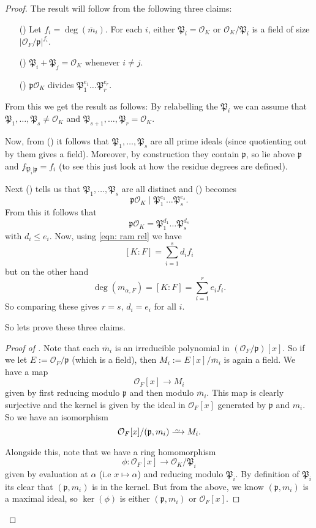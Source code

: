 \documentclass[11pt,a4paper]{report}
\theoremstyle{plain}
\theoremstyle{definition}
\theoremstyle{definition}
\def \gothP{\mathfrak{P}}
\def\gothp{\mathfrak{p}}
\def \a{\alpha}
\def \OO {\mathcal{O}}
\def \ov{\overline}
\def \lra{\longrightarrow}
\newcommand\isorightarrow{\xrightarrow{
		\,\smash{\raisebox{-0.65ex}{\ensuremath{\scriptstyle\sim}}}\,}}
\begin{document}
	\begin{proof}
		The result will  follow from the following three claims:
		\begin{itemize}
			\item[(\faGamepad)] Let $f_i=\deg(\ov{m}_i)$. For each $i$, either  $\gothP_i=\OO_K$ or $\OO_K/\gothP_i$ is a field of size $|\OO_F/\gothp|^{f_i}$.
			\item[(\faRocket)] $\gothP_i+\gothP_j=\OO_K$ whenever $i \neq j$.
			\item [(\faMotorcycle)] $\gothp\OO_K$ divides $\gothP_1^{e_1}\dots\gothP_r^{e_r}$.
		\end{itemize}
		
		From this we get the result as follows: By relabelling the $\gothP_i$ we can assume that  $\gothP_1,\dots,\gothP_s \neq \OO_K$ and $\gothP_{s+1},\dots,\gothP_r=\OO_K$. 
		
		Now, from (\faGamepad) it follows that  $\gothP_1,\dots,\gothP_s$ are all prime ideals (since quotienting out by them gives a field). Moreover, by construction they contain $\gothp$, so lie above $\gothp$ and $f_{\gothP_i|\gothp}=f_i$ (to see this just look at how the residue degrees are defined).
		
		Next (\faRocket) tells us that  $\gothP_1,\dots,\gothP_s$ are all distinct and (\faMotorcycle) becomes \[\gothp\OO_K \mid \gothP_1^{e_1}\dots\gothP_s^{e_s}.\] From this it follows that \[\gothp\OO_K = \gothP_1^{d_1}\dots\gothP_s^{d_s}\] with $d_i \leq e_i$. Now, using \ref{eqn: ram rel} we have \[[K:F]=\sum_{i=1}^s d_if_i\] but on the other hand \[\deg(m_{\a,F})=[K:F]=\sum_{i=1}^r e_if_i.\] So comparing these gives $r=s$, $d_i=e_i$ for all $i$.
		
		So lets prove these three claims.
		
		\begin{proof}[Proof of \faGamepad]
			Note that each $\ov{m}_i$ is an irreducible polynomial in $(\OO_F/\gothp)[x]$. So if we let $E:=\OO_F/\gothp$ (which is a field), then $M_i:=E[x]/\ov{m}_i$ is again a field. We have a map \[\OO_F[x] \lra M_i\] given by first reducing modulo $\gothp$ and then modulo $\ov{m}_i$. This map is clearly surjective and the kernel is given by the ideal in $\OO_F[x]$ generated by $\gothp$ and $m_i$. So we have an isomorphism \[\OO_F[x]/(\gothp,m_i) \isorightarrow M_i.\]
			
			Alongside this, note that we have a ring homomorphism \[\phi:\OO_F[x] \lra \OO_K/\gothP_i\] given by evaluation at $\a$  (i.e $x \mapsto \a$) and reducing modulo $\gothP_i$. By definition of $\gothP_i$ its clear that $(\gothp,m_i)$ is in the kernel. But from the above, we know $(\gothp,m_i)$ is a maximal ideal, so $\ker(\phi)$ is either $(\gothp,m_i)$ or $\OO_F[x]$.
			

\end{proof}
\end{proof}
\end{document}
